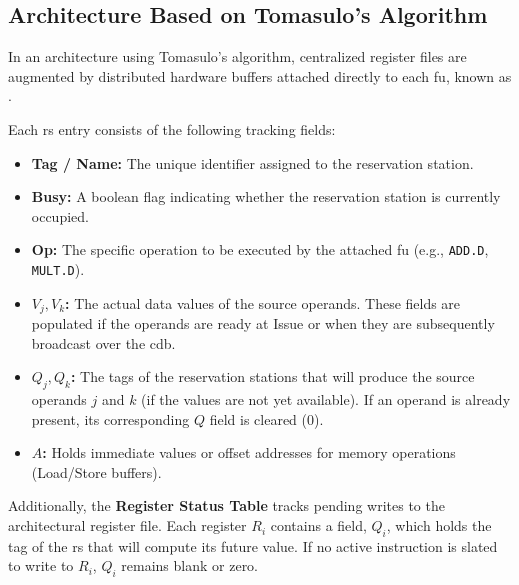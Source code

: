 \subsection{ Architecture Based on Tomasulo's Algorithm}
\label{subsec:tomasulo_fp_arch}

In an architecture using Tomasulo's algorithm, centralized register files are augmented by distributed hardware buffers attached directly to each \gls{fu}, known as \textbf{}.

Each \gls{rs} entry consists of the following tracking fields:
\begin{itemize}
    \item \textbf{Tag / Name:} The unique identifier assigned to the reservation station.
    \item \textbf{Busy:} A boolean flag indicating whether the reservation station is currently occupied.
    \item \textbf{Op:} The specific operation to be executed by the attached \gls{fu} (e.g., \texttt{ADD.D}, \texttt{MULT.D}).
    \item \textbf{$V_j, V_k$:} The actual data values of the source operands. These fields are populated if the operands are ready at Issue or when they are subsequently broadcast over the \gls{cdb}.
    \item \textbf{$Q_j, Q_k$:} The tags of the reservation stations that will produce the source operands $j$ and $k$ (if the values are not yet available). If an operand is already present, its corresponding $Q$ field is cleared ($0$).
    \item \textbf{$A$:} Holds immediate values or offset addresses for memory operations (Load/Store buffers).
\end{itemize}

Additionally, the \textbf{Register Status Table} tracks pending writes to the architectural register file. Each register $R_i$ contains a field, $Q_i$, which holds the tag of the \gls{rs} that will compute its future value. If no active instruction is slated to write to $R_i$, $Q_i$ remains blank or zero.

